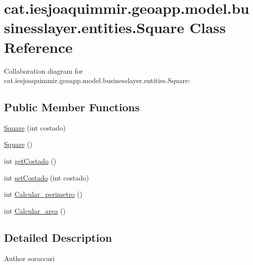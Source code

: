 \hypertarget{classcat_1_1iesjoaquimmir_1_1geoapp_1_1model_1_1businesslayer_1_1entities_1_1_square}{}\section{cat.\+iesjoaquimmir.\+geoapp.\+model.\+businesslayer.\+entities.\+Square Class Reference}
\label{classcat_1_1iesjoaquimmir_1_1geoapp_1_1model_1_1businesslayer_1_1entities_1_1_square}


Collaboration diagram for cat.\+iesjoaquimmir.\+geoapp.\+model.\+businesslayer.\+entities.\+Square\+:
\subsection*{Public Member Functions}
\begin{DoxyCompactItemize}
\item 
\mbox{\hyperlink{classcat_1_1iesjoaquimmir_1_1geoapp_1_1model_1_1businesslayer_1_1entities_1_1_square_acc139723f45139973f8ae2efd0b6de3e}{Square}} (int costado)
\item 
\mbox{\hyperlink{classcat_1_1iesjoaquimmir_1_1geoapp_1_1model_1_1businesslayer_1_1entities_1_1_square_acbccd01900aa490e952c9b88610d1ca4}{Square}} ()
\item 
int \mbox{\hyperlink{classcat_1_1iesjoaquimmir_1_1geoapp_1_1model_1_1businesslayer_1_1entities_1_1_square_a352d9b6915c9963278973edf50c75358}{get\+Costado}} ()
\item 
int \mbox{\hyperlink{classcat_1_1iesjoaquimmir_1_1geoapp_1_1model_1_1businesslayer_1_1entities_1_1_square_a87430f56635d2f48d54cd62de926b535}{set\+Costado}} (int costado)
\item 
int \mbox{\hyperlink{classcat_1_1iesjoaquimmir_1_1geoapp_1_1model_1_1businesslayer_1_1entities_1_1_square_aac1c5925c4159bde1bdda90211665b93}{Calcular\+\_\+perimetro}} ()
\item 
int \mbox{\hyperlink{classcat_1_1iesjoaquimmir_1_1geoapp_1_1model_1_1businesslayer_1_1entities_1_1_square_a0079f76d8fef7dbeb3aaa510af5e0eef}{Calcular\+\_\+area}} ()
\end{DoxyCompactItemize}


\subsection{Detailed Description}
\begin{DoxyAuthor}{Author}
soraccari 
\end{DoxyAuthor}


